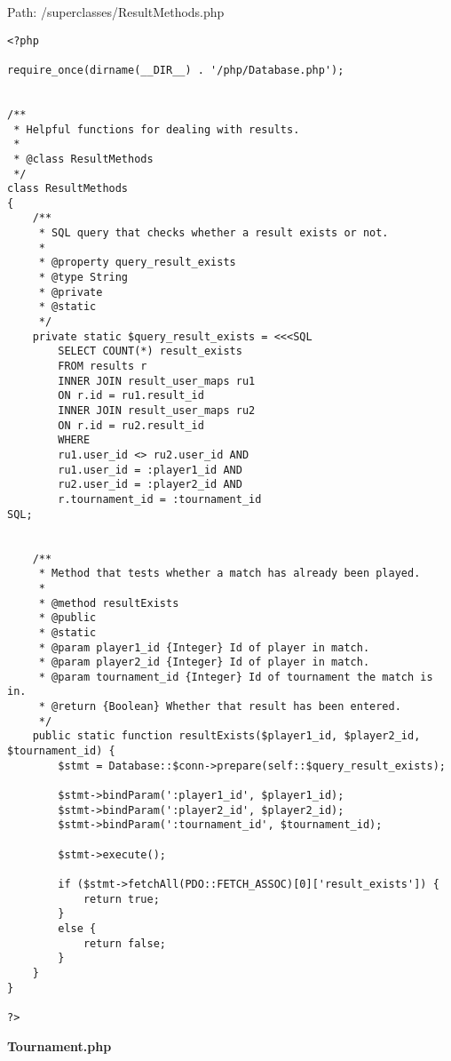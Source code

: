 Path: /superclasses/ResultMethods.php
{\scriptsize
\begin{lstlisting}
<?php

require_once(dirname(__DIR__) . '/php/Database.php');


/**
 * Helpful functions for dealing with results.
 *
 * @class ResultMethods
 */
class ResultMethods
{
	/**
	 * SQL query that checks whether a result exists or not.
	 *
	 * @property query_result_exists
	 * @type String
	 * @private
	 * @static
	 */
	private static $query_result_exists = <<<SQL
		SELECT COUNT(*) result_exists
		FROM results r
		INNER JOIN result_user_maps ru1
		ON r.id = ru1.result_id
		INNER JOIN result_user_maps ru2
		ON r.id = ru2.result_id
		WHERE
		ru1.user_id <> ru2.user_id AND
		ru1.user_id = :player1_id AND
		ru2.user_id = :player2_id AND
		r.tournament_id = :tournament_id
SQL;


	/**
	 * Method that tests whether a match has already been played.
	 *
	 * @method resultExists
	 * @public
	 * @static
	 * @param player1_id {Integer} Id of player in match.
	 * @param player2_id {Integer} Id of player in match.
	 * @param tournament_id {Integer} Id of tournament the match is in.
	 * @return {Boolean} Whether that result has been entered.
	 */
	public static function resultExists($player1_id, $player2_id, $tournament_id) {
		$stmt = Database::$conn->prepare(self::$query_result_exists);

		$stmt->bindParam(':player1_id', $player1_id);
		$stmt->bindParam(':player2_id', $player2_id);
		$stmt->bindParam(':tournament_id', $tournament_id);

		$stmt->execute();

		if ($stmt->fetchAll(PDO::FETCH_ASSOC)[0]['result_exists']) {
			return true;
		}
		else {
			return false;
		}
	}
}

?>\end{lstlisting}
}
\textbf{Tournament.php}

